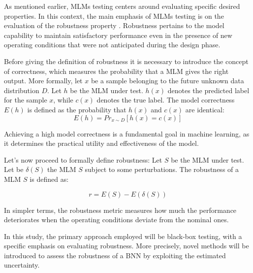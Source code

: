 As mentioned earlier, MLMs testing centers around evaluating specific desired properties. In this context, the main emphasis of MLMs testing is on the evaluation of the robustness property \cite{Marijan_2020}. Robustness pertains to the model capability to maintain satisfactory performance even in the presence of new operating conditions that were not anticipated during the design phase.

Before giving the definition of robustness it is necessary to introduce the concept of correctness, which measures the probability that a MLM gives the right output. More formally, let $x$ be a sample belonging to the future unknown data distribution $D$. Let $h$ be the MLM under test. $h(x)$ denotes the predicted label for the sample $x$, while $c(x)$ denotes the true label. The model correctness $E(h)$ is defined as the probability that $h(x)$ and $c(x)$ are identical:
\[
	E(h)  = Pr_{x\sim D}[h(x) = c(x)]
\]

Achieving a high model correctness is a fundamental goal in machine learning, as it determines the practical utility and effectiveness of the model. 

Let's now proceed to formally define robustness: Let $S$ be the MLM under test. Let be $\delta (S)$ the MLM $S$ subject to some perturbations. The robustness of a MLM $S$ is defined as:

\[
	r = E(S) - E(\delta (S))
\]

In simpler terms, the robustness metric measures how much the performance deteriorates when the operating conditions deviate from the nominal ones.

In this study, the primary approach employed will be black-box testing, with a specific emphasis on evaluating robustness. More precisely, novel methods will be introduced to assess the robustness of a BNN by exploiting the estimated uncertainty.